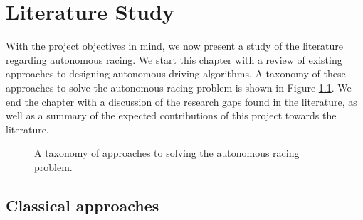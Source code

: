 \chapter{Literature Study}
\label{chp:litreview}

With the project objectives in mind, we now present a study of the literature regarding autonomous racing.
We start this chapter with a review of existing approaches to designing autonomous driving algorithms.
A taxonomy of these approaches to solve the autonomous racing problem is shown in Figure \ref{fig:lit_tax_sec}.
We end the chapter with a discussion of the research gaps found in the literature, as well as a summary of the expected contributions of this project towards the literature.

\begin{figure}[htb!]
    \centering
    
    \caption[A taxonomy of the autonomous racing literature with sections]{A taxonomy of approaches to solving the autonomous racing problem.}
    \label{fig:lit_tax_sec}
\end{figure}


\section{Classical approaches}\label{sec:classic}




